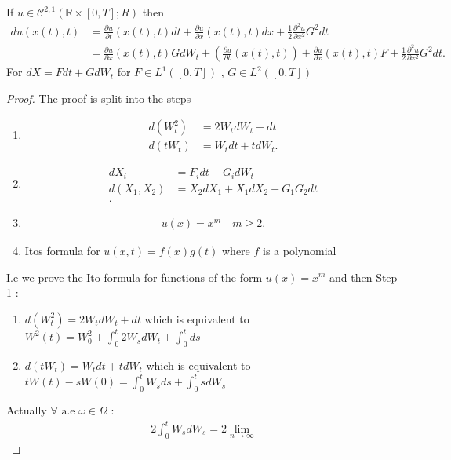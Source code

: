 \begin{definition}
  If $u \in  \mathcal{C}^{2,1}(\mathbb{R} \times  [0,T] ; R) $   then 
  \begin{align*}
    d u(x(t),t) &= \frac{\partial u}{\partial t} (x(t),t) dt + \frac{\partial u}{\partial x}(x(t),t) dx + \frac{1}{2} \frac{\partial^2 u}{\partial x^2}G^2dt \\ 
    &= \frac{\partial u}{\partial x}(x(t),t)GdW_t +(\frac{\partial u}{\partial t}(x(t),t) ) + \frac{\partial u}{\partial x}(x(t),t) F + \frac{1}{2} \frac{\partial ^2 u}{\partial x^2}G^2 dt 
  .\end{align*}
  For $dX = F dt + G dW_t$ for $F \in  L^{1}([0,T]) $ , $G \in  L^2([0,T])$
\end{definition}
\begin{proof}
  The proof is split into the steps
  \begin{enumerate}
   \item  
     \begin{align*}
       d(W_t^2) &= 2W_t  dW_t + dt\\
       d(tW_t) &= W_t dt + t d W_t
     .\end{align*}
    \item 
      \begin{align*}
        dX_i &= F_i dt + G_i dW_t \\
        d(X_{1},X_{2}) &= X_2 dX_1 + X_{1} dX_{2} + G_{1}G_{2}dt \\
      .\end{align*}
    \item 
      \begin{align*}
        u(x) =  x^{m}  \quad m\ge 2
      .\end{align*} 
    \item Itos formula for $u(x,t) = f(x)g(t)$ where $f$ is a polynomial
  \end{enumerate}
  I.e we prove the Ito formula for functions of the form $u(x) = x^{m} $ and then 
 Step 1 : 
 \begin{enumerate}
  \item $d(W_t^2) = 2 W_t dW_t + dt$ which is equivalent to $W^2(t) = W_0^{2} + \int_0^{t} 2 W_s dW_t + \int_0^{t} ds  $ 
  \item $d(tW_t) = W_t dt + t dW_t$ which is equivalent to $tW(t) - sW(0) = \int_0^{t} W_s ds + \int_0^{t} s dW_s  $
 \end{enumerate}
 Actually $\forall \text{ a.e } \omega  \in  \Omega $ : 
 \begin{align*}
   2 \int_0^{t} W_s dW_s = 2 \lim_{n \to \infty}  

\end{align*}
\end{proof}
